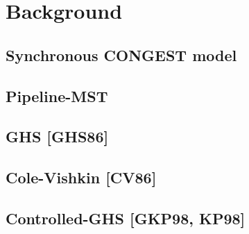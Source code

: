 \section{Background}

\subsection{Synchronous CONGEST model}

\subsection{Pipeline-MST}

\subsection{GHS [GHS86]}

\subsection{Cole-Vishkin [CV86]}

\subsection{Controlled-GHS [GKP98, KP98]}